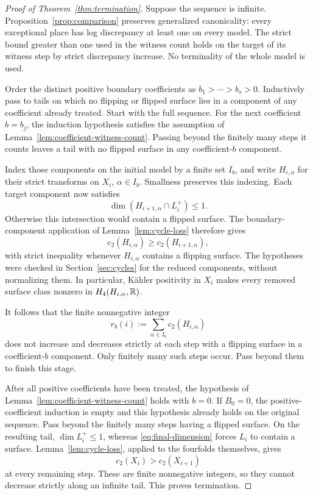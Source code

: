 \begin{proof}[Proof of Theorem~\ref{thm:termination}]
Suppose the sequence is infinite.  Proposition~\ref{prop:comparison}
preserves generalized canonicality: every exceptional place has
log discrepancy at least one on every model.  The strict bound greater
than one used in the witness count holds on the target of its witness
step by strict discrepancy increase.  No terminality of the whole
model is used.

Order the distinct positive boundary coefficients as
$b_1>\cdots>b_s>0$.  Inductively pass to tails on which no flipping
or flipped surface lies in a component of any coefficient already
treated.  Start with the full sequence.  For the next coefficient
$b=b_j$, the induction hypothesis satisfies the assumption of
Lemma~\ref{lem:coefficient-witness-count}.  Passing beyond the finitely
many steps it counts leaves a tail with no flipped surface in any
coefficient-$b$ component.

Index those components on the initial model by a finite set $I_b$,
and write $H_{i,\alpha}$ for their strict transforms on $X_i$,
$\alpha\in I_b$.  Smallness preserves this indexing.  Each target
component now satisfies
\[
 \dim(H_{i+1,\alpha}\cap L_i^+)\leq1.
\]
Otherwise this intersection would contain a flipped surface.
The boundary-component application of Lemma~\ref{lem:cycle-loss}
therefore gives
\[
 c_2(H_{i,\alpha})\geq c_2(H_{i+1,\alpha}),
\]
with strict inequality whenever $H_{i,\alpha}$ contains a flipping
surface.  The hypotheses were checked in Section~\ref{sec:cycles}
for the reduced components, without normalizing them.  In particular,
K\"ahler positivity in $X_i$ makes every removed surface class nonzero
in $H_4(H_{i,\alpha},\mathbb R)$.

It follows that the finite nonnegative integer
\[
 r_b(i):=\sum_{\alpha\in I_b}c_2(H_{i,\alpha})
\]
does not increase and decreases strictly at each step with a flipping
surface in a coefficient-$b$ component.  Only finitely many such
steps occur.  Pass beyond them to finish this stage.

After all positive coefficients have been treated, the hypothesis of
Lemma~\ref{lem:coefficient-witness-count} holds with $b=0$.  If
$B_0=0$, the positive-coefficient induction is empty and this hypothesis
already holds on the original sequence.  Pass beyond the finitely many
steps having a flipped surface.  On the resulting tail,
$\dim L_i^+\leq1$, whereas \eqref{eq:final-dimension} forces $L_i$ to
contain a surface.  Lemma~\ref{lem:cycle-loss}, applied to the
fourfolds themselves, gives
\[
 c_2(X_i)>c_2(X_{i+1})
\]
at every remaining step.  These are finite nonnegative integers, so
they cannot decrease strictly along an infinite tail.  This proves
termination.
\end{proof}
